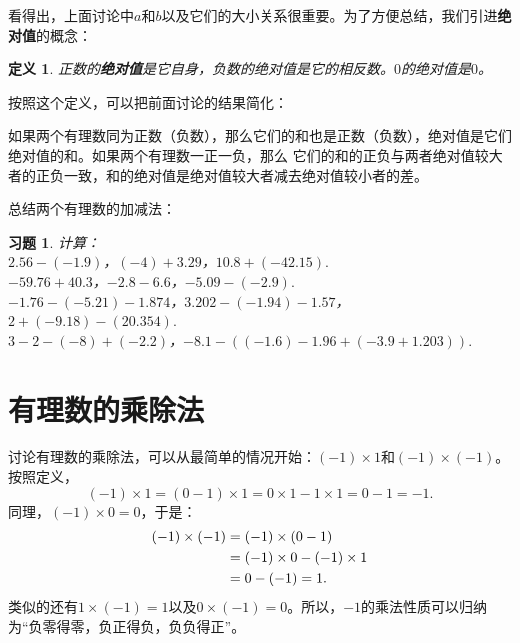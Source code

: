 \documentclass[12pt,UTF8]{ctexbook}
\newtheorem{df}{定义}[section]
\newtheorem{xt}{习题}[section]
\begin{document}
看得出，上面讨论中$a$和$b$以及它们的大小关系很重要。为了方便总结，我们引进\textbf{绝对值}的概念：
\begin{df}\label{df:3-0-0}
    正数的\textbf{绝对值}是它自身，负数的绝对值是它的相反数。$0$的绝对值是$0$。
\end{df}
按照这个定义，可以把前面讨论的结果简化：

如果两个有理数同为正数（负数），那么它们的和也是正数（负数），绝对值是它们绝对值的和。如果两个有理数一正一负，那么
它们的和的正负与两者绝对值较大者的正负一致，和的绝对值是绝对值较大者减去绝对值较小者的差。

总结两个有理数的加减法：
\begin{center}
\end{center}

\begin{xt}\label{xt:3-0-0}
    计算：\\
    \indent $2.56 - (-1.9)$，$(-4) + 3.29$，$10.8 + (-42.15).$ \\
    \indent $-59.76 + 40.3$，$-2.8 - 6.6$，$-5.09 - (-2.9).$ \\
    \indent $-1.76 -(-5.21) - 1.874$，$3.202 - (-1.94) - 1.57$，$2 + (-9.18) - (20.354).$ \\
    \indent $3 - 2 - (-8) + (-2.2)$，$-8.1 - ((-1.6) - 1.96 + (-3.9 + 1.203)).$
\end{xt}

\section{有理数的乘除法}
讨论有理数的乘除法，可以从最简单的情况开始：$(-1) \times 1$和$(-1) \times (-1)$。按照定义，
$$(-1) \times 1 = (0 - 1) \times 1 = 0 \times 1 - 1 \times 1 = 0 - 1 = -1.$$
同理，$(-1) \times 0 = 0$，于是：
\begin{align}
    (-1) \times (-1) &= (-1) \times (0 - 1) \notag \\
    &= (-1) \times 0 - (-1) \times 1 \notag \\
    &= 0 - (-1) = 1. \notag
\end{align}
类似的还有$1 \times (-1) = 1$以及$0 \times (-1) = 0$。所以，$-1$的乘法性质可以归纳为“负零得零，负正得负，负负得正”。
\end{document}
